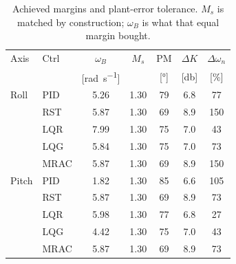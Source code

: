 \begin{table}[!ht]
\centering
\caption{Achieved margins and plant-error tolerance. $M_s$ is matched by construction; $\omega_B$ is what that equal margin bought.}
\label{tab:verification}
\begin{tabular}{llccccc}
\toprule
Axis & Ctrl & $\omega_B$ & $M_s$ & PM & $\Delta K$ & $\Delta\omega_n$ \\
 & & [\si{\radian\per\second}] & & [\si{\degree}] & [\si{\decibel}] & [\%] \\
\midrule
Roll & PID & 5.26 & 1.30 & 79 & 6.8 & 77 \\
 & RST & 5.87 & 1.30 & 69 & 8.9 & 150 \\
 & LQR & 7.99 & 1.30 & 75 & 7.0 & 43 \\
 & LQG & 5.84 & 1.30 & 75 & 7.0 & 73 \\
 & MRAC & 5.87 & 1.30 & 69 & 8.9 & 150 \\
\midrule
Pitch & PID & 1.82 & 1.30 & 85 & 6.6 & 105 \\
 & RST & 5.87 & 1.30 & 69 & 8.9 & 73 \\
 & LQR & 5.98 & 1.30 & 77 & 6.8 & 27 \\
 & LQG & 4.42 & 1.30 & 75 & 7.0 & 43 \\
 & MRAC & 5.87 & 1.30 & 69 & 8.9 & 73 \\
\bottomrule
\end{tabular}
\end{table}